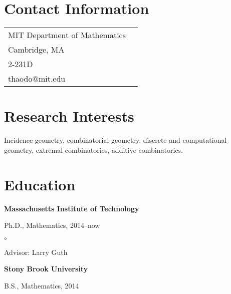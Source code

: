 \documentclass[margin,line]{res}
\newenvironment{list1}{
  \begin{list}{\ding{113}}{%
      \setlength{\itemsep}{0in}
      \setlength{\parsep}{0in} \setlength{\parskip}{0in}
      \setlength{\topsep}{0in} \setlength{\partopsep}{0in}
      \setlength{\leftmargin}{0.17in}}}{\end{list}}
\newenvironment{list2}{
  \begin{list}{$\circ$}{%
      \setlength{\itemsep}{0in}
      \setlength{\parsep}{0in} \setlength{\parskip}{0in}
      \setlength{\topsep}{0in} \setlength{\partopsep}{0in}
      \setlength{\leftmargin}{0.2in}}}{\end{list}}
\begin{document}
\thispagestyle{empty}

\begin{resume}
\section{\sc Contact Information}
\vspace{.05in}
\begin{tabular}{@{}p{3in}p{4in}}
MIT Department of Mathematics\\
Cambridge, MA\\
2-231D\\
thaodo$@$mit.edu
\end{tabular}


\section{\sc Research Interests}
 Incidence geometry,  combinatorial geometry, discrete and computational geometry, extremal combinatorics, additive combinatorics.

\section{\sc Education}
{\bf Massachusetts Institute of Technology}\\
\vspace*{-.1in}
\begin{list1}
\item[] Ph.D., Mathematics, 2014--now
\begin{list2}
\vspace*{.05in}
\item Advisor:  Larry Guth
\end{list2}
\end{list1}

{\bf Stony Brook University}\\
\vspace*{-.1in}
\begin{list1}
\item[] B.S., Mathematics,  2014
\end{list1}





\end{resume}
\end{document}
